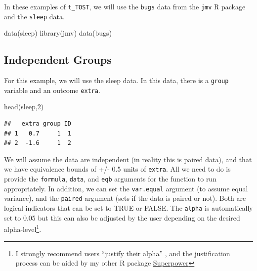 \documentclass[]{interact}
\theoremstyle{plain}%
\theoremstyle{definition}
\theoremstyle{remark}
\newenvironment{Shaded}{\begin{snugshade}}{\end{snugshade}}
\newcommand{\DecValTok}[1]{\textcolor[rgb]{0.00,0.00,0.81}{#1}}
\newcommand{\FunctionTok}[1]{\textcolor[rgb]{0.00,0.00,0.00}{#1}}
\newcommand{\NormalTok}[1]{#1}
\newcommand{\StringTok}[1]{\textcolor[rgb]{0.31,0.60,0.02}{#1}}
\begin{document}
\newpage

In these examples of \texttt{t\_TOST}, we will use the \texttt{bugs}
data from the \texttt{jmv} R package and the \texttt{sleep} data.

\begin{Shaded}
\begin{Highlighting}[]
\FunctionTok{data}\NormalTok{(}\StringTok{\textquotesingle{}sleep\textquotesingle{}}\NormalTok{)}
\FunctionTok{library}\NormalTok{(jmv)}
\FunctionTok{data}\NormalTok{(}\StringTok{\textquotesingle{}bugs\textquotesingle{}}\NormalTok{)}
\end{Highlighting}
\end{Shaded}

\hypertarget{independent-groups}{%
\subsection{Independent Groups}\label{independent-groups}}

For this example, we will use the sleep data. In this data, there is a
\texttt{group} variable and an outcome \texttt{extra}.

\begin{Shaded}
\begin{Highlighting}[]
\FunctionTok{head}\NormalTok{(sleep,}\DecValTok{2}\NormalTok{)}
\end{Highlighting}
\end{Shaded}

\begin{verbatim}
##   extra group ID
## 1   0.7     1  1
## 2  -1.6     1  2
\end{verbatim}

We will assume the data are independent (in reality this is paired
data), and that we have equivalence bounds of +/- 0.5 units of
\texttt{extra}. All we need to do is provide the \texttt{formula},
\texttt{data}, and \texttt{eqb} arguments for the function to run
appropriately. In addition, we can set the \texttt{var.equal} argument
(to assume equal variance), and the \texttt{paired} argument (sets if
the data is paired or not). Both are logical indicators that can be set
to TRUE or FALSE. The \texttt{alpha} is automatically set to 0.05 but
this can also be adjusted by the user depending on the desired
alpha-level\footnote{I strongly recommend users ``justify their alpha''
  \citep{jya1, jya2}, and the justification process can be aided by my
  other R package \href{https://aaroncaldwell.us/Superpower}{Superpower}}.
\end{document}
